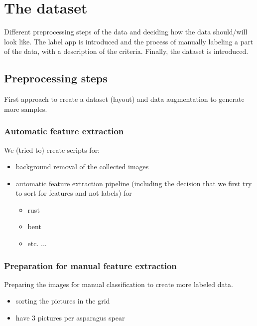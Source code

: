 \section{The dataset}

Different preprocessing steps of the data and deciding how the data should/will look like. The label app is introduced and the process of manually labeling a part of the data, with a description of the criteria. Finally, the dataset is introduced.


\subsection{Preprocessing steps}

First approach to create a dataset (layout) and data augmentation to generate more samples.


\subsubsection{Automatic feature extraction}

We (tried to) create scripts for:

\begin{itemize}
\item background removal of the collected images
\item automatic feature extraction pipeline (including the decision that we first try to sort for features and not labels) for

\begin{itemize}
\item rust
\item bent
\item etc. ...
\end{itemize}

\end{itemize}


\subsubsection{Preparation for manual feature extraction}

Preparing the images for manual classification to create more labeled data.

\begin{itemize}
\item sorting the pictures in the grid
\item have 3 pictures per asparagus spear
\end{itemize}


